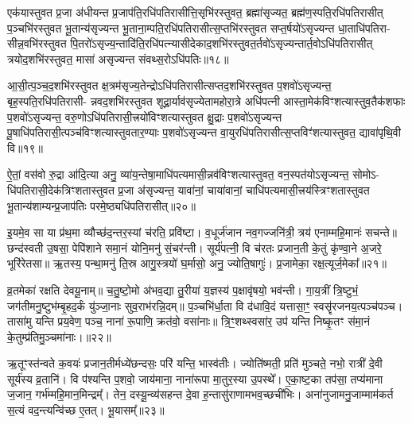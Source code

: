 {\anuvakamend[{वसू॑नां भा॒गो॑\-ऽसि॒ षट्च॑त्वारिꣳशच्च॥९॥}]}

एक॑यास्तुवत प्र॒जा अ॑धीयन्त प्र॒जाप॑ति॒रधि॑पतिरासीत्ति॒सृभि॑रस्तुवत॒ ब्रह्मा॑सृज्यत॒ ब्रह्म॑ण॒स्पति॒रधि॑पतिरासीत् प॒ञ्चभि॑रस्तुवत भू॒तान्य॑सृज्यन्त भू॒ताना॒म्पति॒रधि॑पतिरासीत्स॒प्तभि॑रस्तुवत सप्त॒र्\mbox{}षयो॑\-ऽसृज्यन्त धा॒ताधि॑पतिरा- सीन्न॒वभि॑रस्तुवत पि॒तरो॑\-ऽसृज्य॒न्तादि॑ति॒रधि॑पत्न्यासीदेकाद॒शभि॑रस्तुवत॒र्तवो॑\-ऽसृज्यन्तार्त॒वो\-ऽधि॑पतिरासीत् त्रयोद॒शभि॑रस्तुवत॒ मासा॑ असृज्यन्त संवथ्स॒रो\-ऽधि॑पतिः॥१८॥

आ॒सी॒त्प॒ञ्च॒द॒शभि॑रस्तुवत क्ष॒त्रम॑सृज्य॒तेन्द्रो\-ऽधि॑पतिरासीत्सप्तद॒शभि॑रस्तुवत प॒शवो॑\-ऽसृज्यन्त॒ बृह॒स्पति॒रधि॑पतिरासी- न्नवद॒शभि॑रस्तुवत शूद्रा॒र्याव॑सृज्येतामहोरा॒त्रे अधि॑पत्नी आस्ता॒मेक॑विꣳशत्यास्तुव॒तैक॑शफाः प॒शवो॑\-ऽसृज्यन्त॒ वरु॒णो\-ऽधि॑पतिरासी॒त्त्रयो॑विꣳशत्यास्तुवत क्षु॒द्राः प॒शवो॑\-ऽसृज्यन्त पू॒षाधि॑पतिरासी॒त्पञ्च॑विꣳशत्यास्तुवतार॒ण्याः प॒शवो॑\-ऽसृज्यन्त वा॒युरधि॑पतिरासीत्स॒प्तविꣳ॑शत्यास्तुवत॒ द्यावा॑पृथि॒वी वि॥१९॥

ऐ॒तां॒ वस॑वो रु॒द्रा आ॑दि॒त्या अनु॒ व्या॑य॒न्तेषा॒माधि॑पत्यमासी॒न्नव॑विꣳशत्यास्तुवत॒ वन॒स्पत॑यो\-ऽसृज्यन्त॒ सोमो\-ऽ- धि॑पतिरासी॒देक॑त्रिꣳशतास्तुवत प्र॒जा अ॑सृज्यन्त॒ यावा॑नां॒ चाया॑वानां॒ चाधि॑पत्यमासी॒त्त्रय॑स्त्रिꣳशतास्तुवत भू॒तान्य॑शाम्यन्प्र॒जाप॑तिः परमे॒ष्ठ्यधि॑पतिरासीत्॥२०॥

{\anuvakamend[{सं॒ व॒थ्स॒रो\-ऽधि॑पति॒र्वि पञ्च॑त्रिꣳशच्च॥10॥}]}

इ॒यमे॒व सा या प्र॑थ॒मा व्यौच्छ॑द॒न्तर॒स्यां च॑रति॒ प्रवि॑ष्टा। व॒धूर्ज॑जान नव॒गज्जनि॑त्री॒ त्रय॑ एनाम्महि॒मानः॑ सचन्ते॥ छन्द॑स्वती उ॒षसा॒ पेपि॑शाने समा॒नं योनि॒मनु॑ सं॒चर॑न्ती। सूर्य॑पत्नी॒ वि च॑रतः प्रजान॒ती के॒तुं कृ॑ण्वा॒ने अ॒जरे॒ भूरि॑रेतसा॥ ऋ॒तस्य॒ पन्था॒मनु॑ ति॒स्र आगु॒स्त्रयो॑ घ॒र्मासो॒ अनु॒ ज्योति॒षागुः॑। प्र॒जामेका॒ रक्ष॒त्यूर्ज॒मेका᳚॥२१॥

व्र॒तमेका॑ रक्षति देवयू॒नाम्॥ च॒तु॒ष्टो॒मो अ॑भव॒द्या तु॒रीया॑ य॒ज्ञस्य॑ प॒क्षावृ॑षयो॒ भव॑न्ती। गा॒य॒त्रीं त्रि॒ष्टुभं॒ जग॑तीमनु॒ष्टुभ॑म्बृ॒हद॒र्कं यु॑ञ्जा॒नाः सुव॒राभ॑रन्नि॒दम्॥ प॒ञ्चभि॑र्धा॒ता वि द॑धावि॒दं यत्तासा॒ꣳ॒ स्वसॄ॑रजनय॒त्पञ्च॑पञ्च। तासा॑मु यन्ति प्रय॒वेण॒ पञ्च॒ नाना॑ रू॒पाणि॒ क्रत॑वो॒ वसा॑नाः॥ त्रि॒ꣳ॒शथ्स्वसा॑र॒ उप॑ यन्ति निष्कृ॒तꣳ स॑मा॒नं के॒तुम्प्र॑तिमु॒ञ्चमा॑नाः।॥२२॥

ऋ॒तूꣳस्त॑न्वते क॒वयः॑ प्रजान॒तीर्मध्ये॑छन्दसः॒ परि॑ यन्ति॒ भास्व॑तीः। ज्योति॑ष्मती॒ प्रति॑ मुञ्चते॒ नभो॒ रात्री॑ दे॒वी सूर्य॑स्य व्र॒तानि॑। वि प॑श्यन्ति प॒शवो॒ जाय॑माना॒ नाना॑रूपा मा॒तुर॒स्या उ॒पस्थे᳚। ए॒का॒ष्ट॒का तप॑सा॒ तप्य॑माना ज॒जान॒ गर्भ॑म्महि॒मान॒मिन्द्रम्᳚। तेन॒ दस्यू॒न्व्य॑सहन्त दे॒वा ह॒न्तासु॑राणामभव॒च्छची॑भिः। अना॑नुजामनु॒जाम्माम॑कर्त स॒त्यं वद॒न्त्यन्वि॑च्छ ए॒तत्। भू॒यासम्᳚॥२३॥

